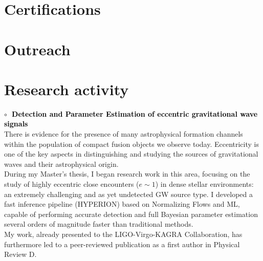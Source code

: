 \section{Certifications}
\vspace{0.2cm}
\vspace{0.2cm}


\section{Outreach}
\vspace{0.2cm}





%

\pagebreak
\section{Research activity}
\textbf{\textcolor{black}{\hspace{0.4cm}$\circ\;$ Detection and Parameter Estimation of eccentric gravitational wave signals}}\vspace{0.05cm}\\
\indent There is evidence for the presence of many astrophysical formation channels within the
population of compact fusion objects we observe today.
Eccentricity is one of the key aspects in distinguishing and studying the sources of
gravitational waves and their astrophysical origin.\\
During my Master's thesis, I began research work in this area, focusing on the study of highly
eccentric close encounters ($e\sim1$) in dense stellar environments: an extremely challenging and
as yet undetected GW source type.
I developed a fast inference pipeline (\textsc{HYPERION}) based on Normalizing Flows and ML,
capable of performing accurate detection and full Bayesian parameter estimation several
orders of magnitude faster than traditional methods.\\
My work, already presented to the LIGO-Virgo-KAGRA Collaboration, has furthermore led to a
peer-reviewed publication as a first author in Physical Review D.
\medskip

